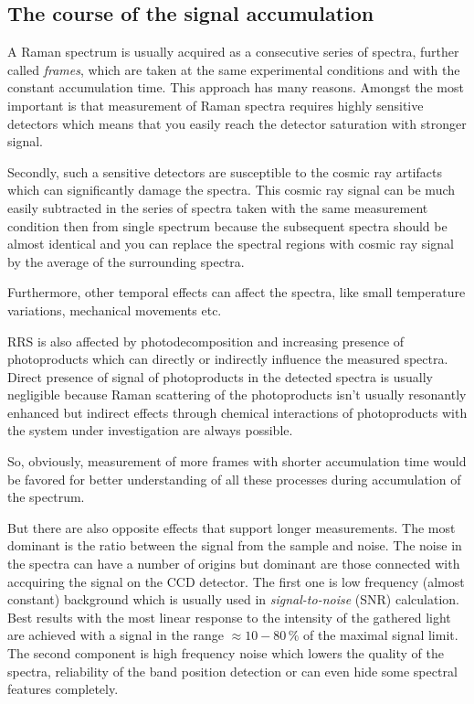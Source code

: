 \subsection{The course of the signal accumulation}

A Raman spectrum is usually acquired as a consecutive series of spectra,
further called \emph{frames}, which are taken at the same experimental
conditions and with the constant accumulation time. This approach has many
reasons. Amongst the most important is that measurement of Raman spectra
requires highly sensitive detectors which means that you easily reach the
detector saturation with stronger signal.

Secondly, such a sensitive detectors are susceptible to the cosmic ray
artifacts which can significantly damage the spectra. This cosmic ray signal
can be much easily subtracted in the series of spectra taken with the same
measurement condition then from single spectrum because the subsequent
spectra should be almost identical and you can replace the spectral regions
with cosmic ray signal by the average of the surrounding spectra.

Furthermore, other temporal effects can affect the spectra, like small
temperature variations, mechanical movements etc.

RRS is also affected by photodecomposition and increasing presence of
photoproducts which can directly or indirectly influence the measured spectra.
Direct presence of signal of photoproducts in the detected spectra is usually
negligible because Raman scattering of the photoproducts isn't usually
resonantly enhanced but indirect effects through chemical interactions of
photoproducts with the system under investigation are always possible.

So, obviously, measurement of more frames with shorter accumulation time would
be favored for better understanding of all these processes during accumulation
of the spectrum.

But there are also opposite effects that support longer measurements. The most
dominant is the ratio between the signal from the sample and noise.
The noise in the
spectra can have a number of origins but dominant are those
connected with accquiring the signal on the CCD detector. The first one is low
frequency (almost constant) background which is usually used in
\emph{signal-to-noise} (SNR) calculation. Best results with the most linear
response to the intensity of the gathered light are achieved with a signal in
the range $\approx 10 - 80\,\%$ of the maximal signal limit.
The second component is high frequency noise which lowers the quality of the
spectra, reliability of the band position detection or can even hide some
spectral features completely.

